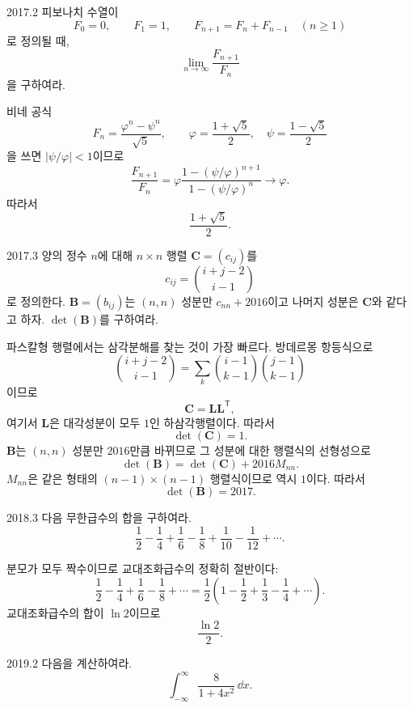 \begin{pastproblem}{2017.2}
피보나치 수열이
\[
F_0=0,\qquad F_1=1,\qquad F_{n+1}=F_n+F_{n-1}\quad(n\ge1)
\]
로 정의될 때,
\[
\lim_{n\to\infty}\frac{F_{n+1}}{F_n}
\]
을 구하여라.
\end{pastproblem}

\begin{solution}
비네 공식
\[
F_n=\frac{\varphi^n-\psi^n}{\sqrt5},\qquad
\varphi=\frac{1+\sqrt5}{2},\quad
\psi=\frac{1-\sqrt5}{2}
\]
을 쓰면 $|\psi/\varphi|<1$이므로
\[
\frac{F_{n+1}}{F_n}
=\varphi\frac{1-(\psi/\varphi)^{n+1}}{1-(\psi/\varphi)^n}
\longrightarrow\varphi.
\]
따라서
\[
\boxed{\frac{1+\sqrt5}{2}}.
\]
\end{solution}

\begin{pastproblem}{2017.3}
양의 정수 $n$에 대해 $n\times n$ 행렬 $\mathbf C=(c_{ij})$를
\[
c_{ij}=\binom{i+j-2}{i-1}
\]
로 정의한다. $\mathbf B=(b_{ij})$는 $(n,n)$ 성분만 $c_{nn}+2016$이고 나머지 성분은 $\mathbf C$와 같다고 하자. $\det(\mathbf B)$를 구하여라.
\end{pastproblem}

\begin{solution}
파스칼형 행렬에서는 삼각분해를 찾는 것이 가장 빠르다. 방데르몽 항등식으로
\[
\binom{i+j-2}{i-1}
=\sum_k\binom{i-1}{k-1}\binom{j-1}{k-1}
\]
이므로
\[
\mathbf C=\mathbf L\mathbf L^{\mathsf T},
\]
여기서 $\mathbf L$은 대각성분이 모두 $1$인 하삼각행렬이다. 따라서
\[
\det(\mathbf C)=1.
\]
$\mathbf B$는 $(n,n)$ 성분만 $2016$만큼 바뀌므로 그 성분에 대한 행렬식의 선형성으로
\[
\det(\mathbf B)=\det(\mathbf C)+2016M_{nn}.
\]
$M_{nn}$은 같은 형태의 $(n-1)\times(n-1)$ 행렬식이므로 역시 $1$이다. 따라서
\[
\boxed{\det(\mathbf B)=2017}.
\]
\end{solution}

\begin{pastproblem}{2018.3}
다음 무한급수의 합을 구하여라.
\[
\frac12-\frac14+\frac16-\frac18+\frac1{10}-\frac1{12}+\cdots.
\]
\end{pastproblem}

\begin{solution}
분모가 모두 짝수이므로 교대조화급수의 정확히 절반이다:
\[
\frac12-\frac14+\frac16-\frac18+\cdots
=\frac12\left(1-\frac12+\frac13-\frac14+\cdots\right).
\]
교대조화급수의 합이 $\ln2$이므로
\[
\boxed{\frac{\ln2}{2}}.
\]
\end{solution}

\begin{pastproblem}{2019.2}
다음을 계산하여라.
\[
\int_{-\infty}^{\infty}\frac{8}{1+4x^2}\,\dd x.
\]
\end{pastproblem}


